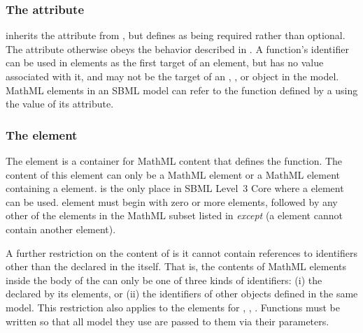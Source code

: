 \subsubsection{The   attribute}

{\FunctionDefinition inherits the  attribute from \SBase, but defines  as being required rather than optional.  The  attribute otherwise obeys the behavior described in .  A function's identifier can be used in  elements as the first target of an  element, but has no value associated with it, and may not be the target of an \InitialAssignment, \EventAssignment, or \Rule object in the model.}
MathML  elements in an SBML model can refer to the function defined by a \FunctionDefinition using the value of its  attribute.

\subsubsection{The  element}
\label{sec:function-definition-math}

The  element is a container for MathML content that
defines the function.  The content of this element can only be a
MathML  element or a MathML 
element containing a  element.  \FunctionDefinition
is the only place in SBML Level~3 Core where a 
element can be used.    element must begin with
zero or more  elements, followed by any other of the
elements in the MathML subset listed in
 \emph{except}  (\ie a
 element cannot contain another 
element).

A further restriction on the content of  is it cannot
contain references to identifiers other than the
 declared in the  itself.  That
is, the contents of MathML  elements inside the body of
the  can only be one of three kinds of
  identifiers: (i) the  declared by its 
  elements, or (ii) the identifiers of other
\FunctionDefinition objects defined in the same model.
This
restriction also applies to the  elements for
, ,  .
Functions must be written so that all model  they use are
passed to them via their parameters.

